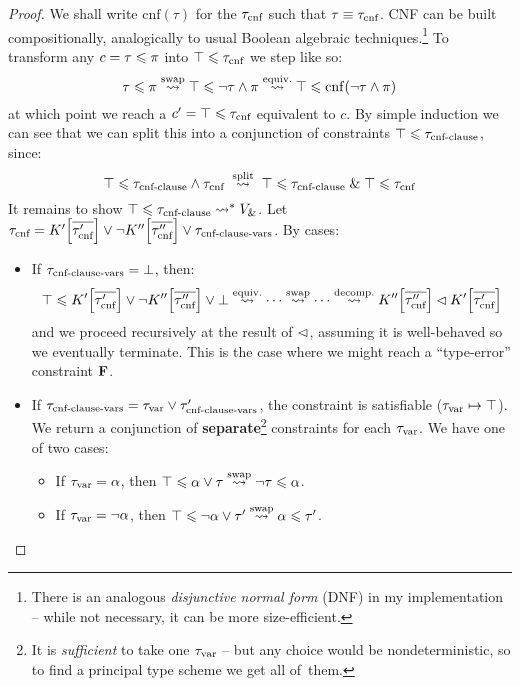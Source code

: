 \begin{proof}
We shall write $\mathrm{cnf}(\tau)$ for the $\tau_\text{cnf}$ such that $\tau \equiv \tau_\text{cnf}$. CNF can be built compositionally, analogically to usual Boolean algebraic techniques.\footnote{There is an analogous \emph{disjunctive normal form} (DNF) in my implementation -- while not necessary, it can be more size-efficient.} To transform any $c = \tau \leqslant \pi$ into $\top \leqslant \tau_\text{cnf}$ we step like so:
$$ \tau \leqslant \pi \stackrel{\text{swap}}{\leadsto} \top \leqslant \lnot \tau \land \pi \stackrel{\text{equiv.}}{\leadsto} \top \leqslant \mathrm{cnf}(\lnot \tau \land \pi) $$
at which point we reach a $c' = \top \leqslant \tau_\text{cnf}$ equivalent to $c$. By simple induction we can see that we can split this into a conjunction of constraints $\top \leqslant \tau_\text{cnf-clause}$, since:
$$ \top \leqslant \tau_\text{cnf-clause} \land \tau_\text{cnf} \;\stackrel{\text{split}}{\leadsto}\; \top \leqslant \tau_\text{cnf-clause} \;\&\; \top \leqslant \tau_\text{cnf} $$
It remains to show $\top \leqslant \tau_\text{cnf-clause} \leadsto^* V_{\&}$. Let $\typcnf = \constr' \left[ \overline{\typcnf'} \right] \join { \comp \constr'' \left[ \overline{\typcnf''} \right]} \join \typclsvars$. By cases: 
\begin{itemize}
    \item If $\tau_\text{cnf-clause-vars} = \bot$, then:
    $$ \top \sub \constr' \left[ \overline{\tau'_\text{cnf}} \right] \join \comp \constr'' \left[ \overline{\tau''_\text{cnf}} \right] \join \bot \stackrel{\text{equiv.}}{\step} \cdots \stackrel{\text{swap}}{\step} \cdots \stackrel{\text{decomp.}}{\step} \constr'' \left[ \overline{\tau''_\text{cnf}} \right] \cdecomp \constr' \left[ \overline{\tau'_\text{cnf}} \right] $$
    and we proceed recursively at the result of $\lhd$, assuming it is well-behaved so we eventually terminate. This is the case where we might reach a \enquote{type-error} constraint $\mathbf F$.
    \item If $\tau_\text{cnf-clause-vars} = \tau_\text{var} \lor \tau_\text{cnf-clause-vars}'$, the constraint is satisfiable ($\tau_\text{var} \mapsto \top$). We return a conjunction of \textbf{separate}\footnote{It is \emph{sufficient} to take one $\tau_\text{var}$ -- but any choice would be nondeterministic, so to find a principal type scheme we get all of~them.} constraints for each $\tau_\text{var}$. We have one of two cases: \begin{itemize}
        \item If $\tau_\text{var} = \alpha$, then $\top \leqslant \alpha \lor \tau \stackrel{\text{swap}}{\leadsto} \lnot \tau \leqslant \alpha$.
        \item If $\tau_\text{var} = \lnot \alpha$, then $\top \leqslant \lnot \alpha \lor \tau' \stackrel{\text{swap}}{\leadsto} \alpha \leqslant \tau'$.
    \end{itemize}
\end{itemize}
\end{proof}


